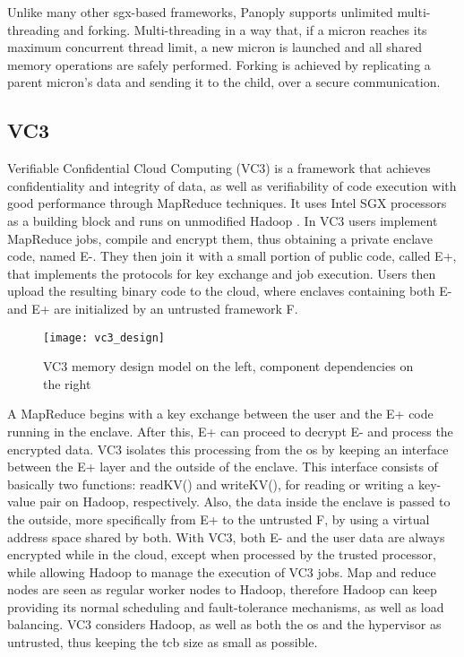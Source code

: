 Unlike many other \gls{sgx}-based frameworks, Panoply supports unlimited multi-threading and forking. Multi-threading in a way that, if a micron reaches its maximum concurrent thread limit, a new micron is launched and all shared memory operations are safely performed. Forking is achieved by replicating a parent micron's data and sending it to the child, over a secure communication. 


\subsection{VC3}
\label{ssec:vc3_mapreduce}

Verifiable Confidential Cloud Computing (VC3) \cite{vc3Paper} is a framework that achieves confidentiality and integrity of data, as well as verifiability of code execution with good performance through MapReduce \cite{mapReduce} techniques. It uses Intel SGX processors as a building block and runs on unmodified Hadoop \cite{hadoop}.
In VC3 users implement MapReduce jobs, compile and encrypt them, thus obtaining a private enclave code, named E-. They then join it with a small portion of public code, called E+, that implements the protocols for key exchange and job execution.
Users then upload the resulting binary code to the cloud, where enclaves containing both E- and E+ are initialized by an untrusted framework F. 

\begin{figure}[htbp]
	\centering
	{\texttt{[image: vc3\_design]}}
	\caption{VC3 memory design model on the left, component dependencies on the right}
\end{figure}

A MapReduce begins with a key exchange between the user and the E+ code running in the enclave. After this, E+ can proceed to decrypt E- and process the encrypted data. VC3 isolates this processing from the \gls{os} by keeping an interface between the E+ layer and the outside of the enclave. This interface consists of basically two functions: readKV() and writeKV(), for reading or writing a key-value pair on Hadoop, respectively. Also, the data inside the enclave is passed to the outside, more specifically from E+ to the untrusted F, by using a virtual address space shared by both.
With VC3, both E- and the user data are always encrypted while in the cloud, except when processed by the trusted processor, while allowing Hadoop to manage the execution of VC3 jobs. Map and reduce nodes are seen as regular worker nodes to Hadoop, therefore Hadoop can keep providing its normal scheduling and fault-tolerance mechanisms, as well as load balancing. VC3 considers Hadoop, as well as both the \gls{os} and the hypervisor as untrusted, thus keeping the \gls{tcb} size as small as possible.

